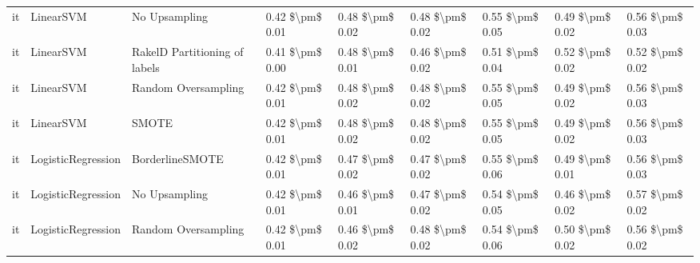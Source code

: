 \begin{tabular}{lllllllll}
      it &                       LinearSVM &                 No Upsampling & 0.42 \$\textbackslash pm\$ 0.01 &           0.48 \$\textbackslash pm\$ 0.02 &       0.48 \$\textbackslash pm\$ 0.02 &        0.55 \$\textbackslash pm\$ 0.05 &                         0.49 \$\textbackslash pm\$ 0.02 &     0.56 \$\textbackslash pm\$ 0.03 \\
      it &                       LinearSVM & RakelD Partitioning of labels & 0.41 \$\textbackslash pm\$ 0.00 &           0.48 \$\textbackslash pm\$ 0.01 &       0.46 \$\textbackslash pm\$ 0.02 &        0.51 \$\textbackslash pm\$ 0.04 &                         0.52 \$\textbackslash pm\$ 0.02 &     0.52 \$\textbackslash pm\$ 0.02 \\
      it &                       LinearSVM &           Random Oversampling & 0.42 \$\textbackslash pm\$ 0.01 &           0.48 \$\textbackslash pm\$ 0.02 &       0.48 \$\textbackslash pm\$ 0.02 &        0.55 \$\textbackslash pm\$ 0.05 &                         0.49 \$\textbackslash pm\$ 0.02 &     0.56 \$\textbackslash pm\$ 0.03 \\
      it &                       LinearSVM &                         SMOTE & 0.42 \$\textbackslash pm\$ 0.01 &           0.48 \$\textbackslash pm\$ 0.02 &       0.48 \$\textbackslash pm\$ 0.02 &        0.55 \$\textbackslash pm\$ 0.05 &                         0.49 \$\textbackslash pm\$ 0.02 &     0.56 \$\textbackslash pm\$ 0.03 \\
      it &              LogisticRegression &               BorderlineSMOTE & 0.42 \$\textbackslash pm\$ 0.01 &           0.47 \$\textbackslash pm\$ 0.02 &       0.47 \$\textbackslash pm\$ 0.02 &        0.55 \$\textbackslash pm\$ 0.06 &                         0.49 \$\textbackslash pm\$ 0.01 &     0.56 \$\textbackslash pm\$ 0.03 \\
      it &              LogisticRegression &                 No Upsampling & 0.42 \$\textbackslash pm\$ 0.01 &           0.46 \$\textbackslash pm\$ 0.01 &       0.47 \$\textbackslash pm\$ 0.02 &        0.54 \$\textbackslash pm\$ 0.05 &                         0.46 \$\textbackslash pm\$ 0.02 &     0.57 \$\textbackslash pm\$ 0.02 \\
      it &              LogisticRegression &           Random Oversampling & 0.42 \$\textbackslash pm\$ 0.01 &           0.46 \$\textbackslash pm\$ 0.02 &       0.48 \$\textbackslash pm\$ 0.02 &        0.54 \$\textbackslash pm\$ 0.06 &                         0.50 \$\textbackslash pm\$ 0.02 &     0.56 \$\textbackslash pm\$ 0.02 \\

\end{tabular}
